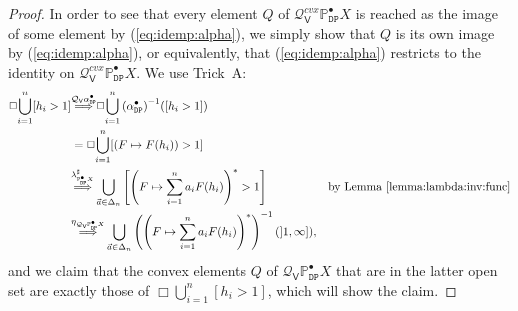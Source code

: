\documentclass[preprint,12pt]{elsarticle}
\newcommand\Pred{\mathbb{P}}
\newcommand\Demon{{\mathtt{D}}}
\newcommand\Nature{{\mathtt{P}}}
\newcommand\DN{{\Demon\Nature}}
\newcommand\invto[1]{{\buildrel {#1} \over\Longrightarrow}}
\newcommand\Smyth{{\mathcal Q}}
\newcommand\Vt{\mathsf{V}}
\newcommand\SV{\Smyth_{\Vt}}
\begin{document}
\begin{proof}
  In order to see that every element $Q$ of
  $\SV^{cvx} {\Pred_\DN^\bullet X}$ is reached as the image of some
  element by (\ref{eq:idemp:alpha}), we simply show that $Q$ is its
  own image by (\ref{eq:idemp:alpha}), or equivalently, that
  (\ref{eq:idemp:alpha}) restricts to the identity on
  $\SV^{cvx} {\Pred_\DN^\bullet X}$.  We use Trick~A:
  \begin{align*}
    \Box {\bigcup_{i=1}^n [h_i > 1]}
    & \invto{\SV {\alpha_\DN^\bullet}}
      \Box {\bigcup_{i=1}^n {(\alpha_\DN^\bullet)}^{-1} ([h_i > 1])}
    \\
    & = \Box {\bigcup_{i=1}^n [(F \mapsto F (h_i)) > 1]} \\
    & \invto{\lambda^\sharp_{\Pred_\DN^\bullet X}}
      \bigcup_{\vec a \in \Delta_n} \left[\left(F \mapsto \sum_{i=1}^n
      a_i F (h_i)\right)^* > 1\right]
    & \text{by Lemma~\ref{lemma:lambda:inv:func}} \\
    & \invto{\eta_{\SV {\Pred_\DN^\bullet X}}}
      \bigcup_{\vec a \in \Delta_n} \left(\left(F \mapsto \sum_{i=1}^n
      a_i F (h_i)\right)^*\right)^{-1} (]1, \infty]),
  \end{align*}
  and we claim that the convex elements $Q$ of $\SV {\Pred_\DN^\bullet
    X}$ that are in the latter open set are exactly those of $\Box
  {\bigcup_{i=1}^n [h_i > 1]}$, which will show the claim.


\end{proof}
\end{document}
